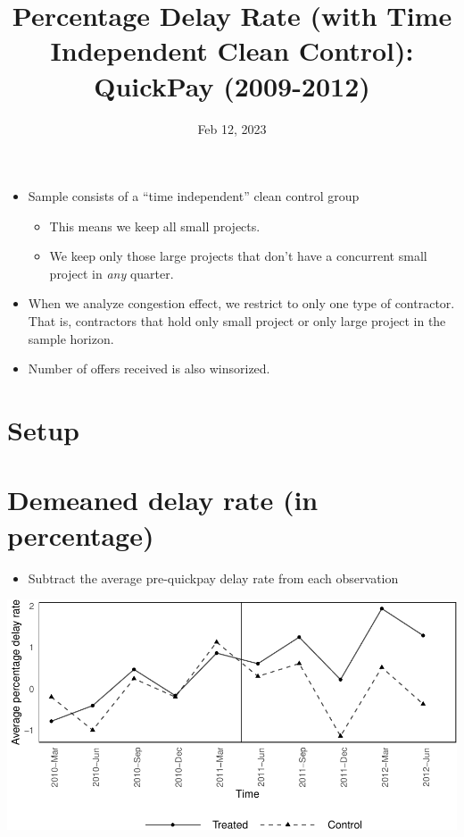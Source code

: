 \documentclass[
]{article}
\title{Percentage Delay Rate (with Time Independent Clean Control):
QuickPay (2009-2012)}
\author{}
\date{\vspace{-2.5em}Feb 12, 2023}
\providecommand{\tightlist}{%
  \setlength{\itemsep}{0pt}\setlength{\parskip}{0pt}}
\begin{document}
\maketitle

\begin{itemize}
\item
  Sample consists of a ``time independent'' clean control group

  \begin{itemize}
  \tightlist
  \item
    This means we keep all small projects.
  \item
    We keep only those large projects that don't have a concurrent small
    project in \emph{any} quarter.
  \end{itemize}
\item
  When we analyze congestion effect, we restrict to only one type of
  contractor. That is, contractors that hold only small project or only
  large project in the sample horizon.
\item
  Number of offers received is also winsorized.
\end{itemize}

\hypertarget{setup}{%
\section{Setup}\label{setup}}

\hypertarget{demeaned-delay-rate-in-percentage}{%
\section{Demeaned delay rate (in
percentage)}\label{demeaned-delay-rate-in-percentage}}

\begin{itemize}
\tightlist
\item
  Subtract the average pre-quickpay delay rate from each observation
\end{itemize}

\includegraphics{qp_first_pc_delay_clean_control_time_independent_files/figure-latex/demeaned_plot_one_type-1.pdf}
\end{document}
